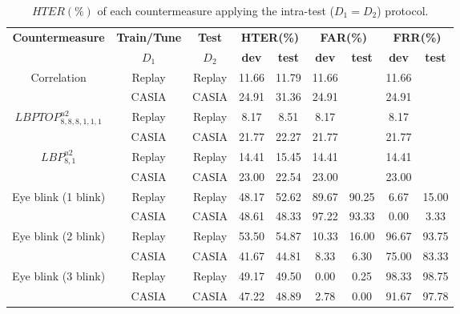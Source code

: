 \hspace{-17mm}\begin{table}[ht!]
\caption{$HTER(\%)$ of each countermeasure applying the intra-test ($D_1=D_2$) protocol.}
\begin{center}
  \begin{tabular}{ | c | c | c | c  c | c  c  | c  c |}
    \hline

   \multirow{2}{*}{\textbf{Countermeasure}} & \textbf{Train/Tune} & \textbf{Test} & \multicolumn{2}{c|}{\textbf{HTER(\%)}} & \multicolumn{2}{c|}{\textbf{FAR(\%)}} & \multicolumn{2}{c|}{\textbf{FRR(\%)}} \\ 
     & $D_1$ & $D_2$ & \textbf{dev} & \textbf{test} & \textbf{dev} & \textbf{test} & \textbf{dev} & \textbf{test}  \\ \hline
    
    \multirow{2}{*}{Correlation} & Replay  & Replay  &  11.66 & 11.79  & 11.66 &  & 11.66  & \\ 
               & CASIA &  CASIA  & 24.91 & 31.36 & 24.91 & & 24.91 & \\ \hline \hline

    \multirow{2}{*}{$LBPTOP_{8,8,8,1,1,1}^{u2}$}  & Replay & Replay  & 8.17 & 8.51  & 8.17& & 8.17 &\\
               & CASIA  & CASIA  & 21.77 & 22.27 & 21.77& & 21.77 &\\ \hline \hline

    \multirow{2}{*}{$LBP_{8,1}^{u2}$} & Replay  & Replay  & 14.41 &15.45 & 14.41 & & 14.41 & \\
               & CASIA  & CASIA  & 23.00  & 22.54 & 23.00 & & 23.00 &\\ \hline \hline
            
    \multirow{2}{*}{Eye blink (1 blink)} & Replay  & Replay  & 48.17 & 52.62 & 89.67 & 90.25 & 6.67 & 15.00\\
               & CASIA  & CASIA  & 48.61 &48.33 & 97.22 & 93.33 & 0.00 & 3.33 \\ \hline \hline

    \multirow{2}{*}{Eye blink (2 blink)} & Replay  & Replay  & 53.50 & 54.87 & 10.33 & 16.00 & 96.67 & 93.75\\
               & CASIA  & CASIA  & 41.67 & 44.81 & 8.33 & 6.30 & 75.00 & 83.33 \\ \hline \hline

    \multirow{2}{*}{Eye blink (3 blink)} & Replay  & Replay  & 49.17 & 49.50 & 0.00 & 0.25& 98.33 & 98.75\\
               & CASIA  & CASIA  & 47.22  & 48.89 & 2.78 & 0.00 & 91.67 & 97.78\\
    \hline
  \end{tabular}
\end{center}
\label{tb:IntraTest}
\end{table}

